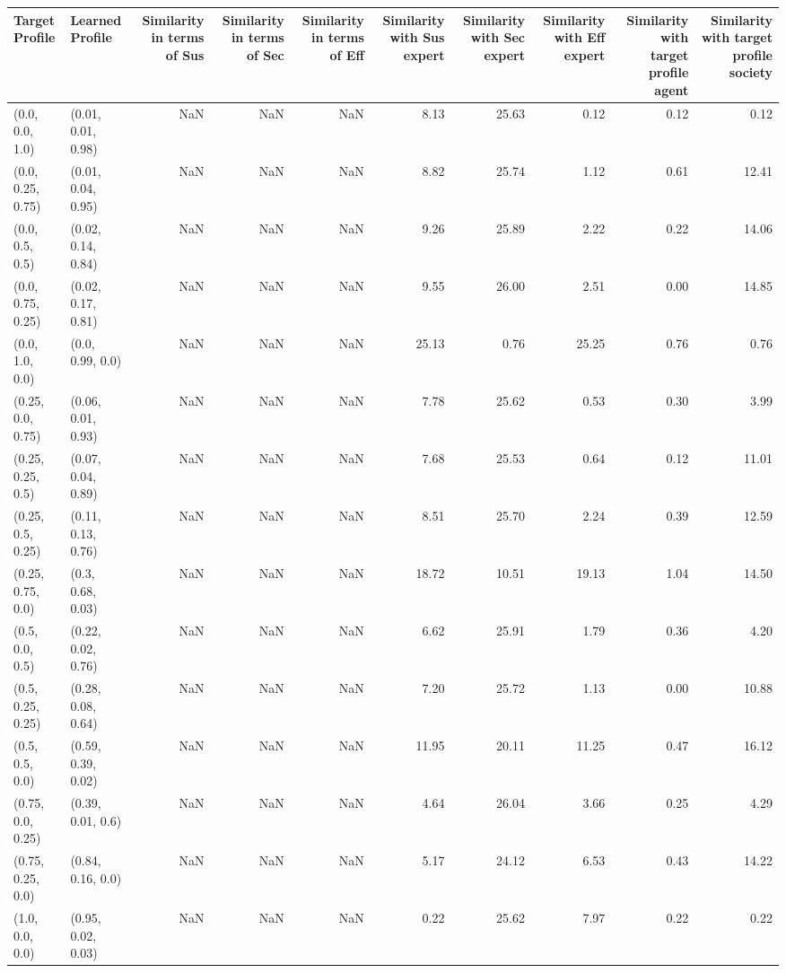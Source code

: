 \begin{tabular}{llrrrrrrrr}
\toprule
Target Profile & Learned Profile & Similarity in terms of Sus & Similarity in terms of Sec & Similarity in terms of Eff & Similarity with Sus expert & Similarity with Sec expert & Similarity with Eff expert & Similarity with target profile agent & Similarity with target profile society \\
\midrule
(0.0, 0.0, 1.0) & (0.01, 0.01, 0.98) & NaN & NaN & NaN & 8.13 & 25.63 & 0.12 & 0.12 & 0.12 \\
(0.0, 0.25, 0.75) & (0.01, 0.04, 0.95) & NaN & NaN & NaN & 8.82 & 25.74 & 1.12 & 0.61 & 12.41 \\
(0.0, 0.5, 0.5) & (0.02, 0.14, 0.84) & NaN & NaN & NaN & 9.26 & 25.89 & 2.22 & 0.22 & 14.06 \\
(0.0, 0.75, 0.25) & (0.02, 0.17, 0.81) & NaN & NaN & NaN & 9.55 & 26.00 & 2.51 & 0.00 & 14.85 \\
(0.0, 1.0, 0.0) & (0.0, 0.99, 0.0) & NaN & NaN & NaN & 25.13 & 0.76 & 25.25 & 0.76 & 0.76 \\
(0.25, 0.0, 0.75) & (0.06, 0.01, 0.93) & NaN & NaN & NaN & 7.78 & 25.62 & 0.53 & 0.30 & 3.99 \\
(0.25, 0.25, 0.5) & (0.07, 0.04, 0.89) & NaN & NaN & NaN & 7.68 & 25.53 & 0.64 & 0.12 & 11.01 \\
(0.25, 0.5, 0.25) & (0.11, 0.13, 0.76) & NaN & NaN & NaN & 8.51 & 25.70 & 2.24 & 0.39 & 12.59 \\
(0.25, 0.75, 0.0) & (0.3, 0.68, 0.03) & NaN & NaN & NaN & 18.72 & 10.51 & 19.13 & 1.04 & 14.50 \\
(0.5, 0.0, 0.5) & (0.22, 0.02, 0.76) & NaN & NaN & NaN & 6.62 & 25.91 & 1.79 & 0.36 & 4.20 \\
(0.5, 0.25, 0.25) & (0.28, 0.08, 0.64) & NaN & NaN & NaN & 7.20 & 25.72 & 1.13 & 0.00 & 10.88 \\
(0.5, 0.5, 0.0) & (0.59, 0.39, 0.02) & NaN & NaN & NaN & 11.95 & 20.11 & 11.25 & 0.47 & 16.12 \\
(0.75, 0.0, 0.25) & (0.39, 0.01, 0.6) & NaN & NaN & NaN & 4.64 & 26.04 & 3.66 & 0.25 & 4.29 \\
(0.75, 0.25, 0.0) & (0.84, 0.16, 0.0) & NaN & NaN & NaN & 5.17 & 24.12 & 6.53 & 0.43 & 14.22 \\
(1.0, 0.0, 0.0) & (0.95, 0.02, 0.03) & NaN & NaN & NaN & 0.22 & 25.62 & 7.97 & 0.22 & 0.22 \\
\bottomrule
\end{tabular}
